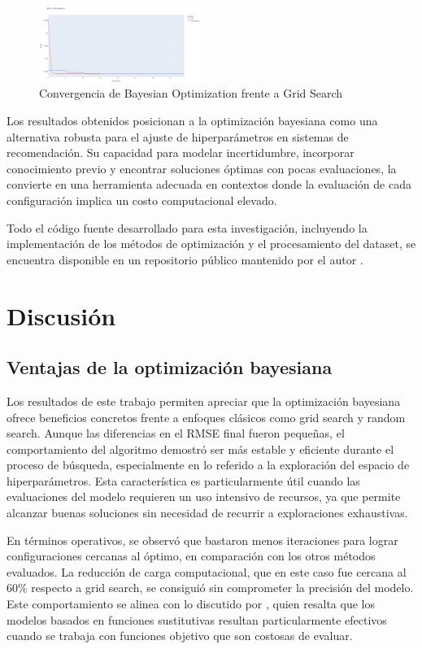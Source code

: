 \documentclass[twocolumn,10pt]{article}
\begin{document}
\begin{figure}[H]
\centering
\includegraphics[width=0.47\textwidth]{fig_bo_vs_grid.png}
\caption{Convergencia de Bayesian Optimization frente a Grid Search}
\label{fig:bo_vs_grid}
\end{figure}

Los resultados obtenidos posicionan a la optimización bayesiana como una alternativa robusta para el ajuste de hiperparámetros en sistemas de recomendación. Su capacidad para modelar incertidumbre, incorporar conocimiento previo y encontrar soluciones óptimas con pocas evaluaciones, la convierte en una herramienta adecuada en contextos donde la evaluación de cada configuración implica un costo computacional elevado.

Todo el código fuente desarrollado para esta investigación, incluyendo la implementación de los métodos de optimización y el procesamiento del dataset, se encuentra disponible en un repositorio público mantenido por el autor \citep{kenny2025github}.

\section{Discusión}

\subsection{Ventajas de la optimización bayesiana}

Los resultados de este trabajo permiten apreciar que la optimización bayesiana ofrece beneficios concretos frente a enfoques clásicos como grid search y random search. Aunque las diferencias en el RMSE final fueron pequeñas, el comportamiento del algoritmo demostró ser más estable y eficiente durante el proceso de búsqueda, especialmente en lo referido a la exploración del espacio de hiperparámetros. Esta característica es particularmente útil cuando las evaluaciones del modelo requieren un uso intensivo de recursos, ya que permite alcanzar buenas soluciones sin necesidad de recurrir a exploraciones exhaustivas.

En términos operativos, se observó que bastaron menos iteraciones para lograr configuraciones cercanas al óptimo, en comparación con los otros métodos evaluados. La reducción de carga computacional, que en este caso fue cercana al 60\% respecto a grid search, se consiguió sin comprometer la precisión del modelo. Este comportamiento se alinea con lo discutido por \citet{frazier2018tutorial}, quien resalta que los modelos basados en funciones sustitutivas resultan particularmente efectivos cuando se trabaja con funciones objetivo que son costosas de evaluar.
\end{document}
